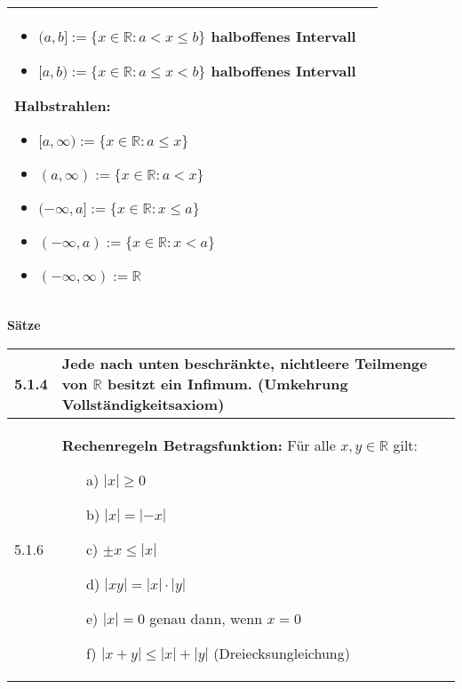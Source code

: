 \begin{table}[H]
\begin{tabularx}{\textwidth}{X m{16cm}}
\begin{itemize}[topsep=-0.5cm]
                    \item $(a,b]:= \{x \in \mathbb{R}: a < x \leq b\}$ halboffenes Intervall
                    \item $[a,b):= \{x \in \mathbb{R}: a \leq x < b\}$ halboffenes Intervall
                \end{itemize} \vspace{-0cm} \hfill \break
                \textbf{Halbstrahlen:}
                \begin{itemize}[topsep=-0.5cm]
                    \item $[a,\infty) := \{x \in \mathbb{R} : a \leq x\}$
                    \item $(a, \infty) := \{x \in \mathbb{R} : a < x\}$
                    \item $(-\infty, a] := \{x \in \mathbb{R}: x \leq a\}$
                    \item $(-\infty,a) := \{x \in \mathbb{R} : x < a\}$
                    \item $(-\infty,\infty):= \mathbb{R}$
                \end{itemize} \vspace{-0cm} \\
        \bottomrule
        
    \end{tabularx}
    \end{table}

    \noindent
    \textbf{Sätze}
    \begin{table}[H]
    \begin{tabularx}{\textwidth}{X m{16cm}}
        \toprule

        5.1.4 & Jede nach unten beschränkte, nichtleere Teilmenge von $\mathbb{R}$ besitzt ein Infimum. \linebreak
                (Umkehrung Vollständigkeitsaxiom) \\
        \midrule
        5.1.6 & \textbf{Rechenregeln Betragsfunktion:} \hfill \break
                Für alle $x,y \in \mathbb{R}$ gilt: 
                \begin{itemize}[topsep=-0.5cm]
                    \item[a)] $|x| \geq 0$
                    \item[b)] $|x| = |-x|$
                    \item[c)] $\pm x \leq |x|$
                    \item[d)] $|xy| = |x| \cdot |y|$
                    \item[e)] $|x| = 0$ genau dann, wenn $x = 0$
                    \item[f)] $|x+y| \leq |x| + |y|$ (Dreiecksungleichung)  
                \end{itemize} \vspace{-0cm} \\

        

        \bottomrule
    \end{tabularx}
    \end{table}


